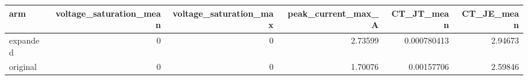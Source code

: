 \begin{tabular}{lrrrrr}
\toprule
arm & voltage\_saturation\_mean & voltage\_saturation\_max & peak\_current\_max\_A & CT\_JT\_mean & CT\_JE\_mean \\
\midrule
expanded & 0 & 0 & 2.73599 & 0.000780413 & 2.94673 \\
original & 0 & 0 & 1.70076 & 0.00157706 & 2.59846 \\
\bottomrule
\end{tabular}
